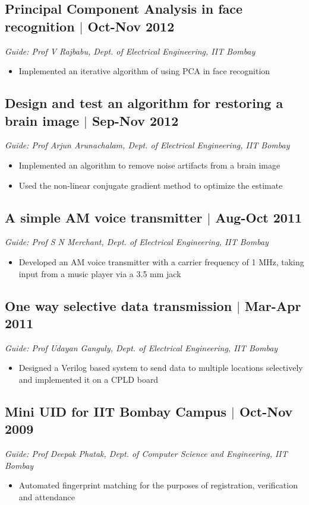 \documentclass[12pt]{article}
\begin{document}
\subsection*{Principal Component Analysis in face recognition $\vert$  Oct-Nov 2012} 
\emph{Guide: Prof V Rajbabu, Dept. of Electrical Engineering, IIT Bombay}  
\begin{itemize}
\item Implemented an iterative algorithm of using PCA in face recognition  
\end{itemize}

\subsection*{Design and test an algorithm for restoring a brain image $\vert$  Sep-Nov 2012}
\emph{Guide: Prof Arjun Arunachalam, Dept. of Electrical Engineering, IIT Bombay}  
\begin{itemize}
\item Implemented an algorithm to remove noise artifacts from a brain image  
\item Used the non-linear conjugate gradient method to optimize the estimate
\end{itemize}

\subsection*{A simple AM voice transmitter $\vert$ Aug-Oct 2011} 
\emph{Guide: Prof S N Merchant, Dept. of Electrical Engineering, IIT Bombay}
\begin{itemize} 
\item Developed an AM voice transmitter with a carrier frequency of 1 MHz, taking input from a music player via a 3.5 mm jack
\end{itemize}

\subsection*{One way selective data transmission $\vert$ Mar-Apr 2011}
\emph{Guide: Prof Udayan Ganguly, Dept. of Electrical Engineering, IIT Bombay}
\begin{itemize}
\item Designed a Verilog based system to send data to multiple locations selectively and implemented it on a CPLD board
\end{itemize}

\subsection*{Mini UID for IIT Bombay Campus $\vert$  Oct-Nov 2009}
\emph{Guide: Prof Deepak Phatak, Dept. of Computer Science and Engineering, IIT Bombay} 
\begin{itemize}
\item Automated fingerprint matching for the purposes of registration, verification and attendance 
\end{itemize}
\end{document}
